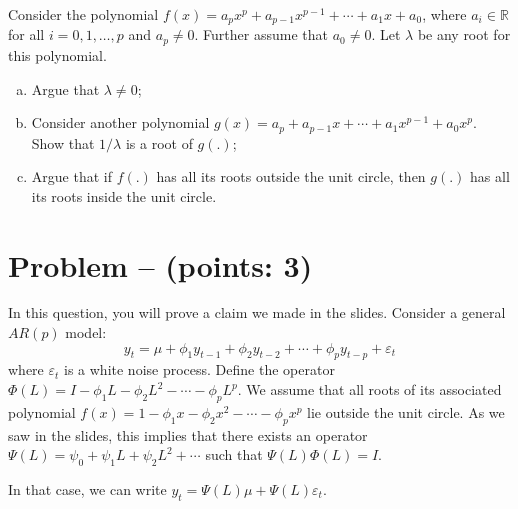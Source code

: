 \documentclass[11pt]{article}
\theoremstyle{definition}
\newcounter{problem}
\renewcommand{\theproblem}{\arabic{problem}}
\newcommand{\problem}[1]{
	\stepcounter{problem}
	\section*{Problem \theproblem{} -- (points: #1)}
}
\begin{document}
Consider the polynomial $f(x) = a_p x^p + a_{p-1} x^{p-1} + \cdots + a_1 x + a_0$, where $a_i \in \mathbb{R}$ for all $i = 0, 1, \ldots, p$ and $a_p \neq 0$. Further assume that $a_0 \neq 0$. Let $\lambda$ be any root for this polynomial.

\begin{enumerate}[a)]
	\item Argue that $\lambda \neq 0$;
	\item Consider another polynomial $g(x) = a_p + a_{p-1} x + \cdots + a_1 x^{p-1} + a_0 x^p$. Show that $1/\lambda$ is a root of $g(.)$;
	\item Argue that if $f(.)$ has all its roots outside the unit circle, then $g(.)$ has all its roots inside the unit circle.
\end{enumerate}

\problem{3}
In this question, you will prove a claim we made in the slides. Consider a general $AR(p)$ model:
\begin{equation*}
y_t = \mu + \phi_1 y_{t-1} + \phi_2 y_{t-2} + \cdots + \phi_p y_{t-p} + \varepsilon_t	
\end{equation*}
where $\varepsilon_t$ is a white noise process. Define the operator $\Phi(L) = I - \phi_1 L - \phi_2 L^2 - \cdots - \phi_p L^p$. We assume that all roots of its associated polynomial $f(x) = 1 - \phi_1x - \phi_2x^2 - \cdots - \phi_px^p$ lie outside the unit circle. As we saw in the slides, this implies that there exists an operator $\Psi(L) = \psi_0 + \psi_1 L + \psi_2 L^2 + \cdots$ such that $\Psi(L)\Phi(L) = I$.

In that case, we can write $y_t = \Psi(L)\mu + \Psi(L)\varepsilon_t$.
\end{document}
